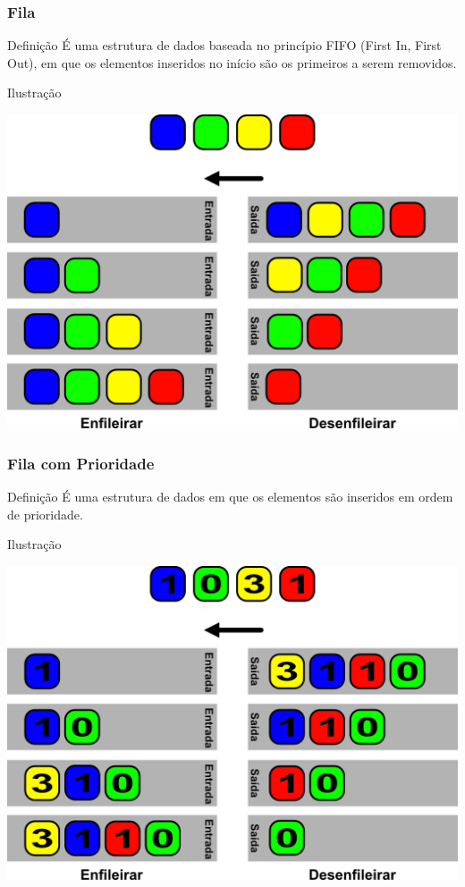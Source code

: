 \documentclass{beamer}
\begin{document}
\begin{frame}
\frametitle{Fila}

\begin{block}{Definição}
	 É uma estrutura de dados baseada no princípio FIFO (First In, First Out), em que os elementos inseridos no início são os primeiros a serem removidos. 
\end{block}\vfill

\begin{exampleblock}{Ilustração}
\begin{center}
	\includegraphics[scale=0.5]{img/fila.png}
\end{center}
\end{exampleblock}
\end{frame}

\begin{frame}
\frametitle{Fila com Prioridade}

\begin{block}{Definição}
É uma estrutura de dados em que os elementos são inseridos em ordem de prioridade.
\end{block}\vfill

\begin{exampleblock}{Ilustração}
\begin{center}
	\includegraphics[scale=0.5]{img/fila-prioridade.png}
\end{center}
\end{exampleblock}
\end{frame}
\end{document}
